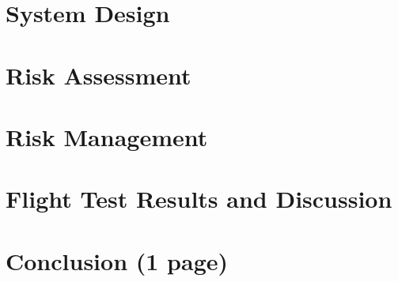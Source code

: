 \documentclass{article}
\begin{document}
\clearpage
\section{System Design}


\clearpage
\section{Risk Assessment}


\clearpage
\section{Risk Management}


\clearpage
\section{Flight Test Results and Discussion}


\clearpage
\section{Conclusion (1 page)}

\end{document}
